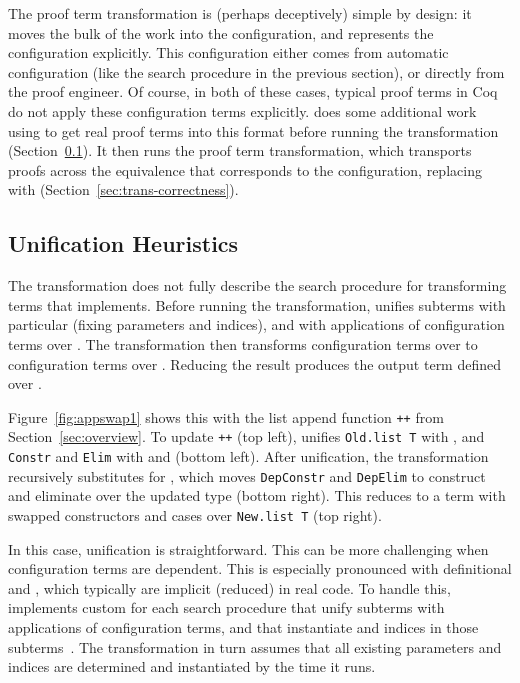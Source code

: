 The proof term transformation is (perhaps deceptively) simple by design:
it moves the bulk of the work into the configuration,
and represents the configuration explicitly.
This configuration either comes from automatic configuration (like the search procedure in the previous section),
or directly from the proof engineer.
Of course, in both of these cases, typical proof terms in Coq do not apply these configuration
terms explicitly.
\toolnamec does some additional work using  to get real proof terms into this format before 
running the transformation (Section~\ref{sec:trans-unification}).
It then runs the proof term transformation, which transports proofs across the equivalence that corresponds to the configuration,
replacing \Aa with \B (Section~\ref{sec:trans-correctness}).

\subsection{Unification Heuristics}
\label{sec:trans-unification}

The transformation does not fully describe the search procedure for transforming terms that \toolnamec implements.
Before running the transformation, \toolnamec unifies subterms with particular \Aa (fixing parameters and indices),
and with applications of configuration terms over \Aa. 
The transformation then transforms configuration terms over \Aa
to configuration terms over \B.
Reducing the result produces the output term defined over \B.

Figure~\ref{fig:appswap1} shows this with the list append function \lstinline{++} from Section~\ref{sec:overview}.
To update \lstinline{++} (top left), \toolnamec unifies \lstinline{Old.list T} with \Aa, and \lstinline{Constr} and \lstinline{Elim}
with  and  (bottom left).
After unification, the transformation recursively substitutes \B
for \Aa, which moves \lstinline{DepConstr} and \lstinline{DepElim}
to construct and eliminate over the updated type (bottom right).
This reduces to a term with swapped constructors and cases over \lstinline{New.list T} (top right).

In this case, unification is straightforward.
This can be more challenging when configuration terms are dependent.
This is especially pronounced with definitional  and ,
which typically are implicit (reduced) in real code.
To handle this, \toolnamec implements custom  for each search procedure
that unify subterms with applications of configuration terms, and that instantiate  and  indices in those subterms~\href{https://github.com/uwplse/pumpkin-pi/blob/v2.0.0/plugin/src/automation/lift/liftconfig.ml}{}. %
The transformation in turn assumes that all existing parameters and indices are determined and instantiated
by the time it runs.

